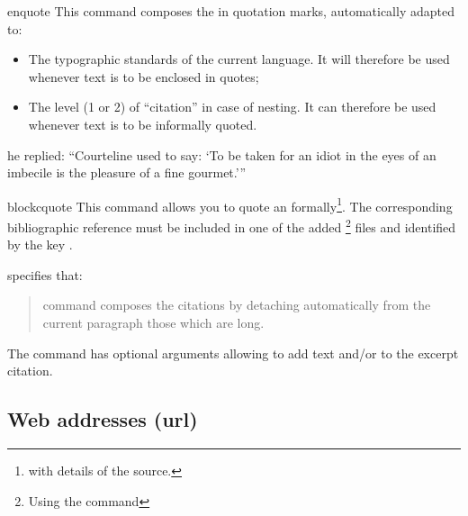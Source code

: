 \documentclass[english,nolocaltoc]{nwejmart}
\newtheorem[style=definition]{fact}
\newtheorem[title-plural=Criteria]{criterion}
\newtheorem[title=random experiment]{rexp}
\begin{document}
\begin{docCommand}{enquote}{}
  This command composes the  in quotation marks, automatically
  adapted to:
  \begin{itemize}
  \item The typographic standards of the current language. It will
    therefore be used whenever text is to be enclosed in quotes;
  \item The level  (1 or 2) of \enquote{citation} in case of
    nesting. It can therefore be used whenever text is to be
    informally quoted.
  \end{itemize}
\begin{bodycode}[listing and text,listing
  options={alsolanguage={[csquotes]TeX}}]
he replied: \enquote{Courteline used to say: \enquote{To be taken for
    an idiot in the eyes of an imbecile is the pleasure of a fine gourmet.}}
\end{bodycode}
\end{docCommand}

\begin{docCommand}{blockcquote}{}
  This command allows you to quote an 
  formally\footnote{\Ie*{} with details of the  source.}. The
  corresponding bibliographic reference must be included in one of the
   added \footnote{Using the   command}   files
  and identified by the key .

\renewcommand{\thempfootnote}{\arabic{mpfootnote}}
\begin{bodycode}[listing and text,listing options={alsolanguage={[biblatex]TeX},alsolanguage={[csquotes]TeX},deletekeywords={[3]footnote}}]
\citeauthor{Bitouze} specifies that:
\blockcquote{Bitouze}{%
   command composes the citations by detaching 
  automatically from the current paragraph those which are
  long.%
}.
\end{bodycode}
\renewcommand{\thempfootnote}{\alph{mpfootnote}}
\end{docCommand}

The  command has optional arguments allowing to
add text  and/or  to the excerpt
citation\autocite[For more details, see for instance][]{Bitouze}.


\subsection{Web addresses (\texorpdfstring{\acrshort{url}}{URL})}
\label{sec-url}
\end{document}
